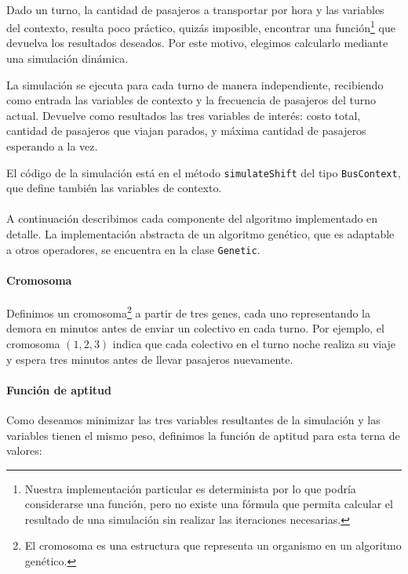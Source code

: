 \documentclass{conaiisi}
\begin{document}
\begin{multicols}{2}
\paragraph{}
Dado un turno, la cantidad de pasajeros a transportar por hora y las variables del contexto, resulta poco práctico, quizás imposible, encontrar una función\footnote{Nuestra implementación particular es determinista por lo que podría considerarse una función, pero no existe una fórmula que permita calcular el resultado de una simulación sin realizar las iteraciones necesarias.} que devuelva los resultados deseados.
Por este motivo, elegimos calcularlo mediante una simulación dinámica.

La simulación se ejecuta para cada turno de manera independiente, recibiendo como entrada las variables de contexto y la frecuencia de pasajeros del turno actual.
Devuelve como resultados las tres variables de interés: costo total, cantidad de pasajeros que viajan parados, y máxima cantidad de pasajeros esperando a la vez.

El código de la simulación está en el método \texttt{simulateShift} del tipo \texttt{BusContext}, que define también las variables de contexto.

\paragraph{}
A continuación describimos cada componente del algoritmo implementado en detalle.
La implementación abstracta de un algoritmo genético, que es adaptable a otros operadores, se encuentra en la clase \texttt{Genetic}.

\paragraph{Cromosoma}

Definimos un cromosoma\footnote{El cromosoma es una estructura que representa un organismo en un algoritmo genético.} a partir de tres genes, cada uno representando la demora en minutos antes de enviar un colectivo en cada turno.
Por ejemplo, el cromosoma $(1,2,3)$ indica que cada colectivo en el turno noche realiza su viaje y espera tres minutos antes de llevar pasajeros nuevamente.

\paragraph{Función de aptitud}

Como deseamos minimizar las tres variables resultantes de la simulación y las variables tienen el mismo peso, definimos la función de aptitud para esta terna de valores:


\end{multicols}
\end{document}
